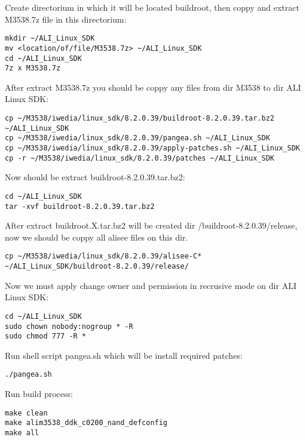 \documentclass[12pt]{report}
\begin{document}
Create directorium in which it will be located buildroot, then coppy and extract M3538.7z file in this directorium:
\begin{lstlisting}[caption= Extract M3538.7z]
mkdir ~/ALI_Linux_SDK
mv <location/of/file/M3538.7z> ~/ALI_Linux_SDK
cd ~/ALI_Linux_SDK
7z x M3538.7z
\end{lstlisting}

After extract M3538.7z you should be coppy any files from dir M3538 to dir ALI Linux SDK:
\begin{lstlisting}[caption= Copy files to ALI Linux SDK]
cp ~/M3538/iwedia/linux_sdk/8.2.0.39/buildroot-8.2.0.39.tar.bz2 ~/ALI_Linux_SDK
cp ~/M3538/iwedia/linux_sdk/8.2.0.39/pangea.sh ~/ALI_Linux_SDK
cp ~/M3538/iwedia/linux_sdk/8.2.0.39/apply-patches.sh ~/ALI_Linux_SDK
cp -r ~/M3538/iwedia/linux_sdk/8.2.0.39/patches ~/ALI_Linux_SDK
\end{lstlisting}
Now should be extract buildroot-8.2.0.39.tar.bz2:
\begin{lstlisting}[caption= Extract buildroot-8.2.0.39.tar.bz2]
cd ~/ALI_Linux_SDK
tar -xvf buildroot-8.2.0.39.tar.bz2
\end{lstlisting}

After extract buildroot.X.tar.bz2 will be created dir /buildroot-8.2.0.39/release, now we should be coppy all alisee files on this dir.
\begin{lstlisting}[caption= Coppy alisee files]
cp ~/M3538/iwedia/linux_sdk/8.2.0.39/alisee-C* ~/ALI_Linux_SDK/buildroot-8.2.0.39/release/
\end{lstlisting}

Now we must apply change owner and permission in recrusive mode on dir ALI Linux SDK:
\begin{lstlisting}[caption= change permission]
cd ~/ALI_Linux_SDK
sudo chown nobody:nogroup * -R
sudo chmod 777 -R *
\end{lstlisting}

Run shell script pangea.sh which will be install required patches:
\begin{lstlisting}[caption= pangea.sh ]
./pangea.sh
\end{lstlisting}

Run build process:
\begin{lstlisting}[caption= make ]
make clean
make alim3538_ddk_c0200_nand_defconfig
make all
\end{lstlisting}
\end{document}
